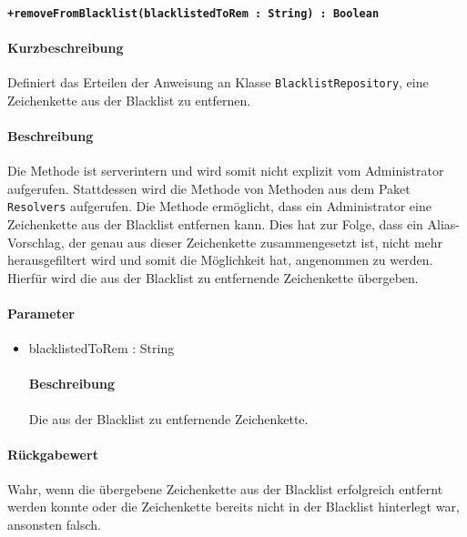 \paragraph*{\texttt{+removeFromBlacklist(blacklistedToRem : String) : Boolean}}%
\paragraph*{Kurzbeschreibung}
Definiert das Erteilen der Anweisung an Klasse \texttt{BlacklistRepository}, eine Zeichenkette aus der Blacklist zu entfernen.
\paragraph*{Beschreibung}
Die Methode ist serverintern und wird somit nicht explizit vom Administrator aufgerufen.
Stattdessen wird die Methode von Methoden aus dem Paket \texttt{Resolvers} aufgerufen.
Die Methode ermöglicht, dass ein Administrator eine Zeichenkette aus der Blacklist entfernen kann.
Dies hat zur Folge, dass ein Alias-Vorschlag, der genau aus dieser Zeichenkette zusammengesetzt ist, nicht mehr herausgefiltert wird und somit die Möglichkeit hat, angenommen zu werden.
Hierfür wird die aus der Blacklist zu entfernende Zeichenkette übergeben.
\paragraph*{Parameter}
\begin{itemize}
    \item blacklistedToRem : String
    		\paragraph*{Beschreibung}
    		Die aus der Blacklist zu entfernende Zeichenkette.
\end{itemize}
\paragraph*{Rückgabewert}
Wahr, wenn die übergebene Zeichenkette aus der Blacklist erfolgreich entfernt werden konnte oder die Zeichenkette bereits nicht in der Blacklist hinterlegt war, ansonsten falsch.
